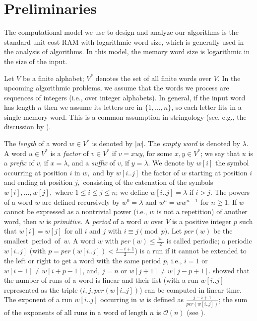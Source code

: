 \documentclass[final]{dmtcs-episciences}
\newcommand{\per}{{per}}
\newcommand{\bigo}{{\mathcal O}}
\begin{document}
\section{Preliminaries}
The computational model we use to design and analyze our algorithms is the standard unit-cost RAM with logarithmic word size, which is generally used in the analysis of algorithms. In this model, the memory word size is logarithmic in the size of the input. 

Let $V$ be a finite alphabet; $V^*$ denotes the set of all finite words over $V$. In the upcoming algorithmic problems, we assume that the words we process are sequences of integers (i.e., over integer alphabets). In general, if the input word has length $n$ then we assume its letters are in $\{1,\ldots,n\}$, so each letter fits in a single memory-word. This is a common assumption in stringology (see, e.g., the discussion by \cite{KaSaBu06}).

The \emph{length} of a word $w\in V^*$ is denoted by $\left|w\right|$. The \emph{empty word} is denoted by ${\lambda}$. 
A word $u\in V^*$ is a \emph{factor} of $v\in V^*$ if $v=xuy$, for some $x, y\in V^*$; we say that $u$ is a \emph{prefix} of $v$, if $x={\lambda}$, and a \emph{suffix} of $v$, if $y={\lambda}.$
We denote by $w[i]$ the symbol occurring at position $i$ in $w,$ and by $w[i..j]$ the factor of $w$ starting at position $i$ and ending at position $j,$ consisting of the catenation of the symbols $w[i], \ldots, w[j],$ where $1\leq i\leq j\leq n$; we define $w[i..j]=\lambda$ if $i>j$. The powers of a word $w$ are defined recursively by $w^0={\lambda}$ and $w^n=ww^{n-1}$  for $n\geq1$. 
If $w$ cannot be expressed as a nontrivial power (i.e., $w$ is not a repetition) of another word, then $w$ is \emph{primitive}. 
A \emph{period} of a word $w$ over $V$ is a positive integer $p$ such that $w[i]=w[j]$ for all $i$ and $j$ with $i\equiv j\pmod{p}$. Let $\per(w)$ be the smallest~period~of~$w$. A word $w$ with $\per(w)\leq\frac{|w|}{2}$ is called periodic; a periodic $w[i..j]$ (with $p=\per(w[i..j])<\frac{j-i+1}{2}$) is a run if it cannot be extended to the left or right to get a word with the same period $p$, i.e., $i = 1$ or $w[i-1] \neq w[i+p-1]$,
and, $j = n$ or $w[j + 1] \neq w[j - p + 1]$. \cite{KK99} showed that the number of runs of a word is linear and their list (with a run $w[i..j]$ represented as the triple $(i,j,\per(w[i..j])$) can be computed in linear time.
The exponent of a run $w[i..j]$ occurring in $w$ is defined as $\frac{j-i+1}{\per(w[i..j])}$; the sum of the exponents of all runs in a word of length $n$ is $\bigo(n)$ (see \cite{KK99}). 
\end{document}
